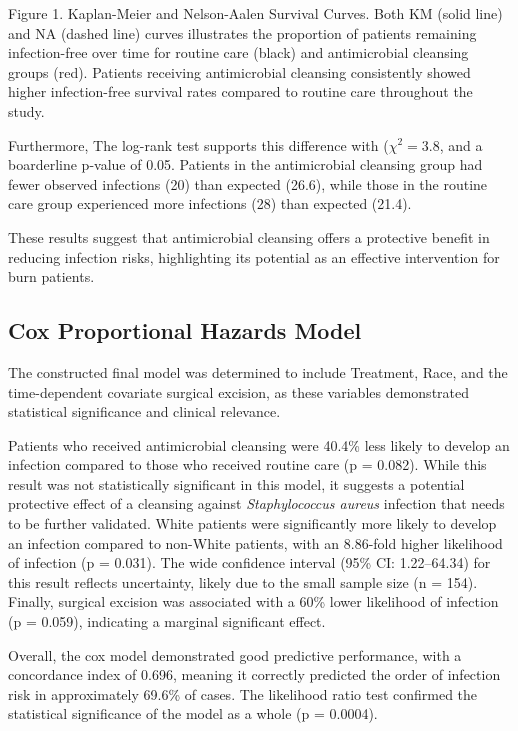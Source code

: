 \documentclass[12pt]{article}
\begin{document}
Figure 1. Kaplan-Meier and Nelson-Aalen Survival Curves. Both KM (solid
line) and NA (dashed line) curves illustrates the proportion of patients
remaining infection-free over time for routine care (black) and
antimicrobial cleansing groups (red). Patients receiving antimicrobial
cleansing consistently showed higher infection-free survival rates
compared to routine care throughout the study.

Furthermore, The log-rank test supports this difference with
(\(\chi^2 = 3.8\), and a boarderline p-value of 0.05. Patients in the
antimicrobial cleansing group had fewer observed infections (20) than
expected (26.6), while those in the routine care group experienced more
infections (28) than expected (21.4).

These results suggest that antimicrobial cleansing offers a protective
benefit in reducing infection risks, highlighting its potential as an
effective intervention for burn patients.

\subsection{Cox Proportional Hazards
Model}\label{cox-proportional-hazards-model}

The constructed final model was determined to include Treatment, Race,
and the time-dependent covariate surgical excision, as these variables
demonstrated statistical significance and clinical relevance.

Patients who received antimicrobial cleansing were 40.4\% less likely to
develop an infection compared to those who received routine care (p =
0.082). While this result was not statistically significant in this
model, it suggests a potential protective effect of a cleansing against
\emph{Staphylococcus aureus} infection that needs to be further
validated. White patients were significantly more likely to develop an
infection compared to non-White patients, with an 8.86-fold higher
likelihood of infection (p = 0.031). The wide confidence interval (95\%
CI: 1.22--64.34) for this result reflects uncertainty, likely due to the
small sample size (n = 154). Finally, surgical excision was associated
with a 60\% lower likelihood of infection (p = 0.059), indicating a
marginal significant effect.

Overall, the cox model demonstrated good predictive performance, with a
concordance index of 0.696, meaning it correctly predicted the order of
infection risk in approximately 69.6\% of cases. The likelihood ratio
test confirmed the statistical significance of the model as a whole (p =
0.0004).
\end{document}
